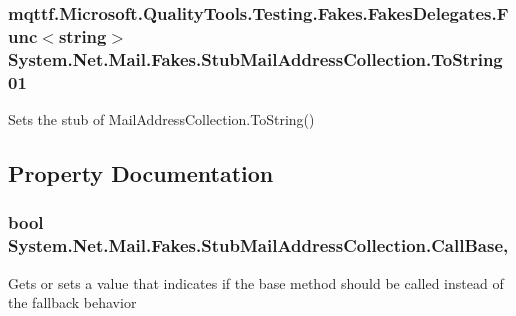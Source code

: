 \hypertarget{class_system_1_1_net_1_1_mail_1_1_fakes_1_1_stub_mail_address_collection_ad375f7bbae8c94560e48c084f7c03a8a}{
\subsubsection[{To\-String01}]{\setlength{\rightskip}{0pt plus 5cm}mqttf.\-Microsoft.\-Quality\-Tools.\-Testing.\-Fakes.\-Fakes\-Delegates.\-Func$<$string$>$ System.\-Net.\-Mail.\-Fakes.\-Stub\-Mail\-Address\-Collection.\-To\-String01}}\label{class_system_1_1_net_1_1_mail_1_1_fakes_1_1_stub_mail_address_collection_ad375f7bbae8c94560e48c084f7c03a8a}


Sets the stub of Mail\-Address\-Collection.\-To\-String()



\subsection{Property Documentation}
\hypertarget{class_system_1_1_net_1_1_mail_1_1_fakes_1_1_stub_mail_address_collection_a344d6ab27dc18f4180a579e27e3bce0a}{
\subsubsection[{Call\-Base}]{\setlength{\rightskip}{0pt plus 5cm}bool System.\-Net.\-Mail.\-Fakes.\-Stub\-Mail\-Address\-Collection.\-Call\-Base\hspace{0.3cm}{\ttfamily [get]}, {\ttfamily [set]}}}\label{class_system_1_1_net_1_1_mail_1_1_fakes_1_1_stub_mail_address_collection_a344d6ab27dc18f4180a579e27e3bce0a}


Gets or sets a value that indicates if the base method should be called instead of the fallback behavior

